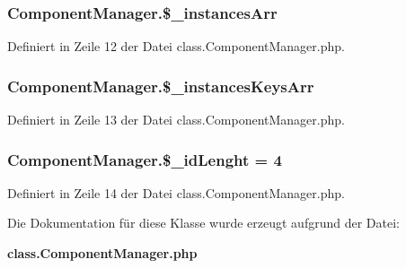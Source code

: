 \subsubsection{\setlength{\rightskip}{0pt plus 5cm}ComponentManager.\$\_\-instancesArr}\label{classComponentManager_71afde970cdafbfec9dd9026b4b8921c}




Definiert in Zeile 12 der Datei class.ComponentManager.php.
\subsubsection{\setlength{\rightskip}{0pt plus 5cm}ComponentManager.\$\_\-instancesKeysArr}\label{classComponentManager_ed6a108e9f463cac5f6b3742c882f5c5}




Definiert in Zeile 13 der Datei class.ComponentManager.php.
\subsubsection{\setlength{\rightskip}{0pt plus 5cm}ComponentManager.\$\_\-idLenght = 4}\label{classComponentManager_da83ecf4d685dcd0f24910766d1ee7e8}




Definiert in Zeile 14 der Datei class.ComponentManager.php.

Die Dokumentation für diese Klasse wurde erzeugt aufgrund der Datei:\begin{CompactItemize}
\item 
{\bf class.ComponentManager.php}\end{CompactItemize}
